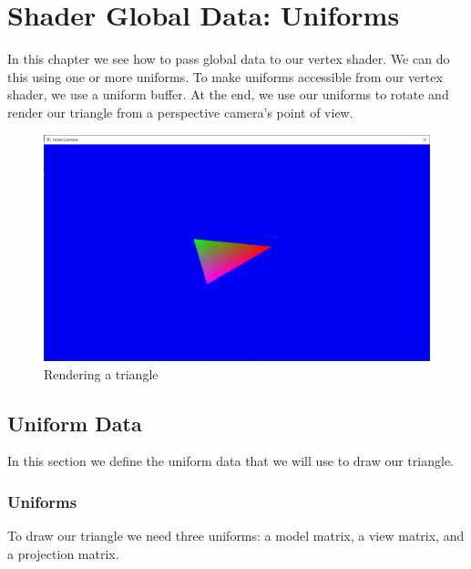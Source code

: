 \chapter{Shader Global Data: Uniforms}

In this chapter we see how to pass global data to our vertex shader.
We can do this using one or more uniforms.
To make uniforms accessible from our vertex shader, we use a uniform buffer.
At the end, we use our uniforms to rotate and render our triangle from a
perspective camera's point of view.

\begin{figure}[ht]
    \centering
    \includegraphics[scale=0.20]{images/ChUniforms/RenderTriangle.png}
    \caption{Rendering a triangle}
    \label{fig::RenderTriangleUniforms}
\end{figure}

\section{Uniform Data}

In this section we define the uniform data that we will use to
draw our triangle.

\subsection{Uniforms}

To draw our triangle we need three uniforms:
a model matrix,
a view matrix,
and a projection matrix.

\begin{minipage}{\linewidth}{\noindent}
    
\end{minipage}

